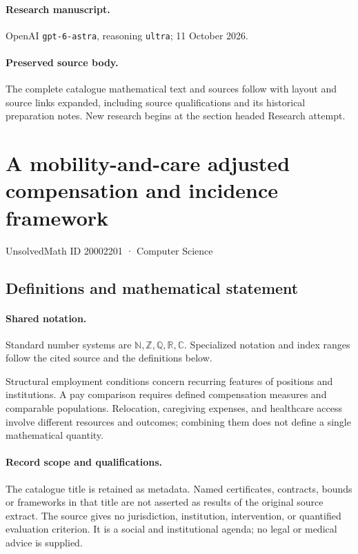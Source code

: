 \documentclass[11pt]{article}
\begin{document}
\paragraph{Research manuscript.} OpenAI \texttt{gpt-6-astra}, reasoning \texttt{ultra}; 11 October 2026.
\paragraph{Preserved source body.} The complete catalogue mathematical text and sources follow with layout and source links expanded, including source qualifications and its historical preparation notes. New research begins at the section headed Research attempt.

\section{A mobility-and-care adjusted compensation and incidence framework}\label{20002201}
{\small UnsolvedMath ID 20002201 · Computer Science}
\subsection{Definitions and mathematical statement}

\paragraph{Shared notation.}Standard number systems are $\mathbb N,\mathbb Z,\mathbb Q,\mathbb R,\mathbb C$. Specialized notation and index ranges follow the cited source and the definitions below.


Structural employment conditions concern recurring features of positions and institutions. A pay comparison requires defined compensation measures and comparable populations. Relocation, caregiving expenses, and healthcare access involve different resources and outcomes; combining them does not define a single mathematical quantity.
\paragraph{Record scope and qualifications.}
The catalogue title is retained as metadata. Named certificates, contracts, bounds or frameworks in that title are not asserted as results of the original source extract.
The source gives no jurisdiction, institution, intervention, or quantified evaluation criterion. It is a social and institutional agenda; no legal or medical advice is supplied.
\end{document}
